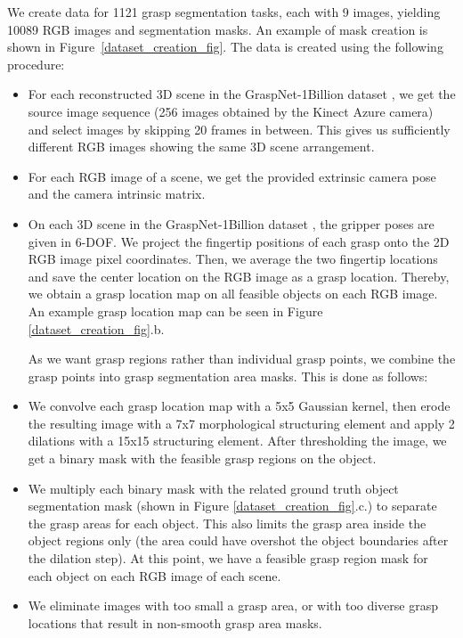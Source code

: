\documentclass[letterpaper]{article} %
\begin{document}
We create data for 1121 grasp segmentation tasks, each with 9 images, yielding 10089 RGB images and segmentation masks. An example of mask creation is shown in Figure~\ref{dataset_creation_fig}. The data is created using the following procedure:
\begin{itemize}

\item  For each reconstructed 3D scene in the GraspNet-1Billion dataset \cite{fang2020graspnet}, we get the source image sequence (256 images obtained by the Kinect Azure camera) and select images by skipping 20 frames in between. This gives us sufficiently different RGB images showing the same 3D scene arrangement.
\item  For each RGB image of a scene, we get the provided extrinsic camera pose and the camera intrinsic matrix.
\item On each 3D scene in the GraspNet-1Billion dataset \cite{fang2020graspnet}, the gripper poses are given in 6-DOF. We project the fingertip positions of each grasp onto the 2D RGB image pixel coordinates. Then, we average the two fingertip locations and save the center location on the RGB image as a grasp location. Thereby, we obtain a grasp location map on all feasible objects on each RGB image. An example grasp location map can be seen in Figure \ref{dataset_creation_fig}.b.

As we want grasp regions rather than individual grasp points, we combine the grasp points into grasp segmentation area masks. This is done as follows:

\item We convolve each grasp location map with a 5x5 Gaussian kernel, then erode the resulting image with a 7x7 morphological structuring element and apply 2 dilations with a 15x15 structuring element. After thresholding the image, we get a binary mask with the feasible grasp regions on the object.

\item We multiply each binary mask with the related ground truth object segmentation mask (shown in Figure \ref{dataset_creation_fig}.c.) to separate the grasp areas for each object. This also limits the grasp area inside the object regions only (the area could have overshot the object boundaries after the dilation step).  At this point, we have a feasible grasp region mask for each object on each RGB image of each scene.

\item We eliminate images with too small a grasp area, or with too diverse grasp locations that result in non-smooth grasp area masks.
\end{itemize}
\end{document}
